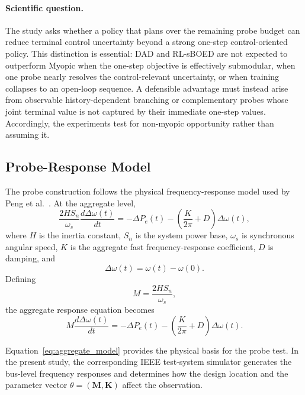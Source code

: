 \documentclass[11pt]{article}
\begin{document}
\paragraph{Scientific question.}
The study asks whether a policy that plans over the remaining probe budget can
reduce terminal control uncertainty beyond a strong one-step control-oriented
policy. This distinction is essential: DAD and RL-sBOED are not expected to
outperform Myopic when the one-step objective is effectively submodular, when
one probe nearly resolves the control-relevant uncertainty, or when training
collapses to an open-loop sequence. A defensible advantage must instead arise
from observable history-dependent branching or complementary probes whose
joint terminal value is not captured by their immediate one-step values.
Accordingly, the experiments test for non-myopic opportunity rather than
assuming it.

\subsection{Probe-Response Model}

The probe construction follows the physical frequency-response model used by Peng et al.~\cite{peng2024}. At the aggregate level,
\[
\frac{2HS_n}{\omega_s}
\frac{d\Delta\omega(t)}{dt}
=
-\Delta P_e(t)
-
\left(
\frac{K}{2\pi}+D
\right)
\Delta\omega(t),
\]
where \(H\) is the inertia constant, \(S_n\) is the system power base, \(\omega_s\) is synchronous angular speed, \(K\) is the aggregate fast frequency-response coefficient, \(D\) is damping, and
\[
\Delta\omega(t)=\omega(t)-\omega(0).
\]
Defining
\[
M=\frac{2HS_n}{\omega_s},
\]
the aggregate response equation becomes
\[
\boxed{
M\frac{d\Delta\omega(t)}{dt}
=
-\Delta P_e(t)
-
\left(
\frac{K}{2\pi}+D
\right)
\Delta\omega(t).
}
\label{eq:aggregate_model}
\]

Equation~\eqref{eq:aggregate_model} provides the physical basis for the probe test. In the present study, the corresponding IEEE test-system simulator generates the bus-level frequency responses and determines how the design location and the parameter vector \(\theta=(\mathbf M,\mathbf K)\) affect the observation.
\end{document}
